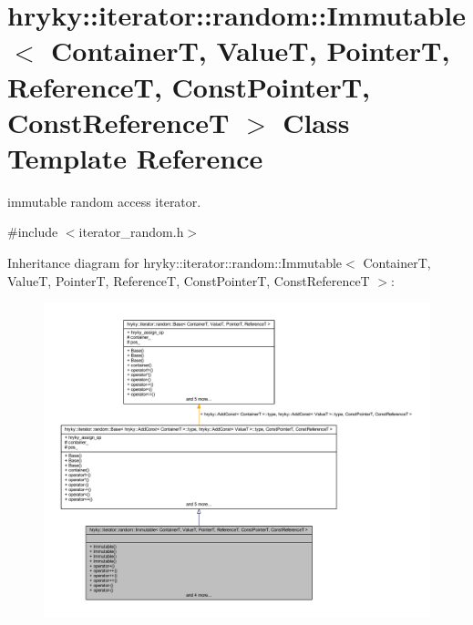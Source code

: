 \hypertarget{classhryky_1_1iterator_1_1random_1_1_immutable}{\section{hryky\-:\-:iterator\-:\-:random\-:\-:Immutable$<$ Container\-T, Value\-T, Pointer\-T, Reference\-T, Const\-Pointer\-T, Const\-Reference\-T $>$ Class Template Reference}
\label{classhryky_1_1iterator_1_1random_1_1_immutable}
}


immutable random access iterator.  




{\ttfamily \#include $<$iterator\-\_\-random.\-h$>$}



Inheritance diagram for hryky\-:\-:iterator\-:\-:random\-:\-:Immutable$<$ Container\-T, Value\-T, Pointer\-T, Reference\-T, Const\-Pointer\-T, Const\-Reference\-T $>$\-:
\nopagebreak
\begin{figure}[H]
\begin{center}
\leavevmode
\includegraphics[width=350pt]{classhryky_1_1iterator_1_1random_1_1_immutable__inherit__graph}
\end{center}
\end{figure}
